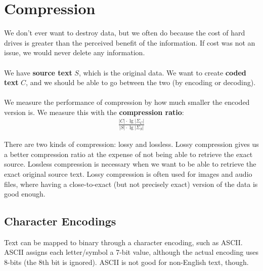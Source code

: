 \documentclass[]{article}
\theoremstyle{definition}
\begin{document}
	\section{Compression}
		We don't ever want to destroy data, but we often do because the cost of hard drives is greater than the perceived benefit of the information. If cost was not an issue, we would never delete any information.
		\\ \\
		We have \textbf{source text} $S$, which is the original data. We want to create \textbf{coded text} $C$, and we should be able to go between the two (by encoding or decoding). 
		\\ \\
		We measure the performance of compression by how much smaller the encoded version is. We measure this with the \textbf{compression ratio}:
		\begin{align*}
			\frac{|C| \cdot \lg |\Sigma_C|}{|S| \cdot \lg |\Sigma_S|}
		\end{align*}
		
		There are two kinds of compression: lossy and lossless. Lossy compression gives us a better compression ratio at the expense of not being able to retrieve the exact source. Lossless compression is necessary when we want to be able to retrieve the exact original source text. Lossy compression is often used for images and audio files, where having a close-to-exact (but not precisely exact) version of the data is good enough.
		
		\subsection{Character Encodings}
			Text can be mapped to binary through a character encoding, such as ASCII. ASCII assigns each letter/symbol a 7-bit value, although the actual encoding uses 8-bits (the 8th bit is ignored). ASCII is not good for non-English text, though.
\end{document}
